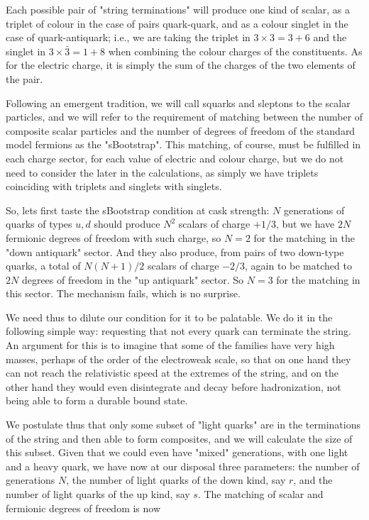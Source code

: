 \documentclass[10pt]{article}
\begin{document}
Each possible pair of "string terminations"
will produce one kind of scalar, as a triplet of
colour in the case of pairs quark-quark, and as
a colour singlet in the case of quark-antiquark; i.e.,
we are taking the triplet in $3 \times 3 = 3 + 6$ and the 
singlet in $3 \times \bar 3 = 1 + 8$ when combining 
the colour charges of the constituents. As for the
electric charge, it is simply the sum of the charges
of the two elements of the pair.

Following an emergent tradition, we will call squarks
and sleptons to the scalar particles, and we will refer
to the requirement of matching between the number of
composite scalar particles and the number of degrees of
freedom of the standard model fermions as the "sBootstrap".
This matching, of course, must be fulfilled in
each charge sector, for each value of electric 
and colour charge, but we do not need to consider
the later in the calculations, as simply we have
triplets coinciding with triplets and singlets
with singlets.


So, lets first taste the sBootstrap condition at cask strength:
$N$ generations of
quarks of types $u, d$ should produce $N^2$ scalars of charge
$+1/3$, but we have $2 N$ fermionic degrees of freedom
with such charge, so $N=2$ for the matching in the
"down antiquark" sector. And they also produce, from pairs
of two down-type quarks, a total of $N (N+1)/2$ scalars
of charge $-2/3$, again to be matched to $2 N$ degrees of
freedom in the "up antiquark" sector. So $N=3$ for the
matching in this sector. The mechanism fails, which
is no surprise.

We need thus to dilute our condition for it to be palatable.
We do it in the following simple way: requesting that not every
quark can terminate the string. An argument for this is
to imagine that some of the families have very high
masses, perhaps of the order of the electroweak scale,
so that on one hand they can not reach the relativistic
speed at the extremes of the string, and on the other hand
they would even disintegrate and decay before 
hadronization, not being able to form a durable bound state.

We postulate thus that only some subset of "light quarks"
are in the terminations of the string and then able to
form composites, and we will calculate the size
of this subset. Given that we could even have
"mixed" generations, with one light and a heavy quark,
we have now at our disposal three parameters: the
number of generations $N$, the number of light quarks of
the down kind, say $r$, and the number of light quarks of
the up kind, say $s$. The matching of scalar and
fermionic degrees of freedom is now
\end{document}
